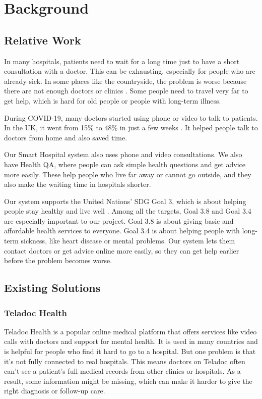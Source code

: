 %
%
\chapter{Background}
\label{chap:background}


\section{Relative Work}
\label{sec:relative-work}



In many hospitals, patients need to wait for a long time just to have a short consultation with a doctor. This can be exhausting, especially for people who are already sick. In some places like the countryside, the problem is worse because there are not enough doctors or clinics \cite{ilo_ruralgap}. Some people need to travel very far to get help, which is hard for old people or people with long-term illness.

During COVID-19, many doctors started using phone or video to talk to patients. In the UK, it went from 15\% to 48\% in just a few weeks \cite{nuffield_gp}. It helped people talk to doctors from home and also saved time.

Our Smart Hospital system also uses phone and video consultations. We also have Health QA, where people can ask simple health questions and get advice more easily. These help people who live far away or cannot go outside, and they also make the waiting time in hospitals shorter.

Our system supports the United Nations’ SDG Goal 3, which is about helping people stay healthy and live well \cite{un_sdg3}. Among all the targets, Goal 3.8 and Goal 3.4 are especially important to our project. Goal 3.8 is about giving basic and affordable health services to everyone. Goal 3.4 is about helping people with long-term sickness, like heart disease or mental problems. Our system lets them contact doctors or get advice online more easily, so they can get help earlier before the problem becomes worse.

\section{Existing Solutions}
\label{sec:existing-solutions}


\subsection{Teladoc Health}
Teladoc Health is a popular online medical platform\cite{teladocwebsite} that offers services like video calls with doctors and support for mental health. It is used in many countries and is helpful for people who find it hard to go to a hospital. But one problem is that it’s not fully connected to real hospitals. This means doctors on Teladoc often can’t see a patient’s full medical records from other clinics or hospitals. As a result, some information might be missing, which can make it harder to give the right diagnosis or follow-up care.


